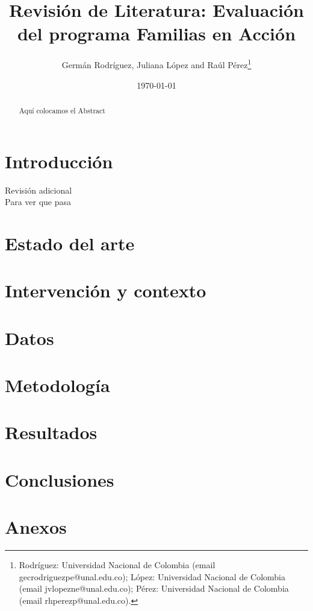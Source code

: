 \documentclass[AER]{AEA}
\begin{document}
\title{Revisión de Literatura: Evaluación del programa Familias en Acción}
\author{Germán Rodríguez, Juliana López and Raúl Pérez\thanks{Rodríguez: Universidad Nacional de Colombia (email gecrodriguezpe@unal.edu.co); López: Universidad Nacional de Colombia (email jvlopezne@unal.edu.co); Pérez: Universidad Nacional de Colombia (email rhperezp@unal.edu.co).}}
\date{\today}

\begin{abstract}
Aquí colocamos el Abstract
\end{abstract}

\maketitle

\section{Introducción}

Revisión adicional \\
Para ver que pasa

\section{Estado del arte}

\section{Intervención y contexto}

\section{Datos}

\section{Metodología}

\section{Resultados}

\section{Conclusiones}

\section{Anexos}

\newpage


\end{document}
